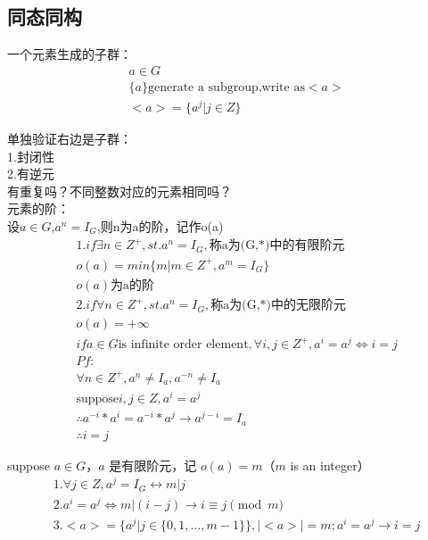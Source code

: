 \documentclass[12pt, a4paper]{article}  %
\begin{document}
\subsection{同态同构}
一个元素生成的子群：
\begin{align}
    &a\in G\\
    &\{a\}\text{generate a subgroup,write as} <a>\\
    &<a>=\{a^j|j\in Z\}
\end{align}

单独验证右边是子群：\\
1.封闭性\\
2.有逆元\\

有重复吗？不同整数对应的元素相同吗？\\

元素的阶：\\
设\(a\in G\),\(a^n=I_G\),则n为a的阶，记作o(a)\\
\begin{align}
    &1.if \exists n\in Z^{+},st. a^n=I_G,\text{称a为(G,*)中的有限阶元}\\
    & o(a)=min\{m|m\in Z^{+},a^m=I_G\}\\
    &o(a)\text{为a的阶}\\
    &2 .if \forall n\in Z^{+},st. a^n=I_G,\text{称a为(G,*)中的无限阶元}\\
    & o(a)=+\infty\\
    & if a\in G \text{is infinite order element}, \forall i,j\in Z^{+},a^i=a^j \Leftrightarrow i=j\\
    &Pf:\\
    & \forall n\in Z^{+}, a^n\neq I_a,a^{-n}\neq I_a\\
    & \text{suppose} i,j\in Z,a^i=a^j\\
    & \therefore a^{-i}*a^{i}=a^{-i}*a^{j}\rightarrow a^{j-i}=I_a\\
    &\therefore i=j
\end{align}



suppose \(a\in G\)，\(a\) 是有限阶元，记 \(o(a)=m\)（\(m\) is an integer）
\begin{align}
    &1.\forall j\in Z,a^j=I_G \leftrightarrow m|j\\
    &2.a^i=a^j \Leftrightarrow   m|(i-j) \rightarrow i \equiv j \pmod{m}\\
    & 3. <a>=\{a^j|j\in \{0,1,...,m-1\}\},|<a>|=m;a^i=a^j \rightarrow i=j
\end {align}
\end{document}
